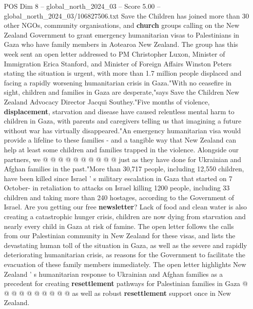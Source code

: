 \begin{textsample}{POS Dim 8 – global\_north\_2024\_03 – Score 5.00 – global\_north\_2024\_03/106827506.txt}  \label{ex:f8_pos_221}
Save the Children has joined more than 30 other NGOs, community organisations, and \textbf{church} groups calling on the New Zealand Government to grant emergency humanitarian visas to Palestinians in Gaza who have family members in Aotearoa New Zealand.
The group has this week sent an open letter addressed to PM Christopher Luxon, Minister of Immigration Erica Stanford, and Minister of Foreign Affairs Winston Peters stating the situation is urgent, with more than 1.7 million people displaced and facing a rapidly worsening humanitarian crisis in Gaza."With no ceasefire in sight, children and families in Gaza are desperate,"says Save the Children New Zealand Advocacy Director Jacqui Southey."Five months of violence, \textbf{displacement}, starvation and disease have caused relentless mental harm to children in Gaza, with parents and caregivers telling us that imagining a future without war has virtually disappeared."An emergency humanitarian visa would provide a lifeline to these families - and a tangible way that New Zealand can help at least some children and families trapped in the violence.
Alongside our partners, we @ @ @ @ @ @ @ @ @ @ just as they have done for Ukrainian and Afghan families in the past."More than 30,717 people, including 12,550 children, have been killed since Israel ' s military escalation in Gaza that started on 7 October- in retaliation to attacks on Israel killing 1200 people, including 33 children and taking more than 240 hostages, according to the Government of Israel.
Are you getting our free \textbf{newsletter}?
Lack of food and clean water is also creating a catastrophic hunger crisis, children are now dying from starvation and nearly every child in Gaza at risk of famine.
The open letter follows the calls from our Palestinian community in New Zealand for these visas, and lists the devastating human toll of the situation in Gaza, as well as the severe and rapidly deteriorating humanitarian crisis, as reasons for the Government to facilitate the evacuation of these family members immediately.
The open letter highlights New Zealand ' s humanitarian response to Ukrainian and Afghan families as a precedent for creating \textbf{resettlement} pathways for Palestinian families in Gaza @ @ @ @ @ @ @ @ @ @ as well as robust \textbf{resettlement} support once in New Zealand.

\end{textsample}

